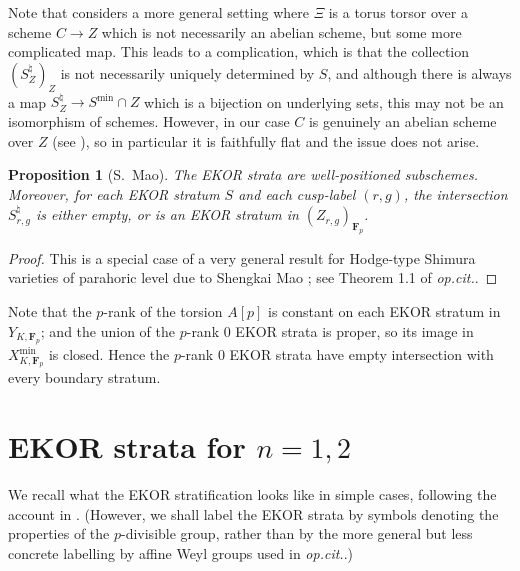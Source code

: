 \documentclass[cjm]{ipart}
\theoremstyle{plain}
\newtheorem{proposition}[theorem]{Proposition}
\theoremstyle{remark}
\newcommand{\Fp}{\mathbf{F}_p}
\numberwithin{equation}{subsection}
\begin{document}
  \begin{remark}
   Note that \cite{lanstroh} considers a more general setting where $\Xi$ is a torus torsor over a scheme $C \to Z$ which is not necessarily an abelian scheme, but some more complicated map. This leads to a complication, which is that the collection $(S_Z^\natural)_Z$ is not necessarily uniquely determined by $S$, and although there is always a map $S_Z^\natural \to S^{\min} \cap Z$ which is a bijection on underlying sets, this may not be an isomorphism of schemes. However, in our case $C$ is genuinely an abelian scheme over $Z$ (see \cite{pilloni20}), so in particular it is faithfully flat and the issue does not arise.
  \end{remark}

  \begin{proposition}[S.~Mao]
   \label{prop:lanstroh}
   The EKOR strata are well-positioned subschemes. Moreover, for each EKOR stratum $S$ and each cusp-label $(r, g)$, the intersection $S^{\natural}_{r, g}$ is either empty, or is an EKOR stratum in $(Z_{r, g})_{\Fp}$.
  \end{proposition}
  
  \begin{proof}
   This is a special case of a very general result for Hodge-type Shimura varieties of parahoric level due to Shengkai Mao \cite{mao-preprint}; see Theorem 1.1 of \emph{op.cit.}.
  \end{proof}
  
  \begin{remark}
   Note that the $p$-rank of the torsion $A[p]$ is constant on each EKOR stratum in $Y_{K, \Fp}$; and the union of the $p$-rank 0 EKOR strata is proper, so its image in $X_{K, \Fp}^{\min}$ is closed. Hence the $p$-rank 0 EKOR strata have empty intersection with every boundary stratum.
  \end{remark}

\section{EKOR strata for \texorpdfstring{$n = 1, 2$}{n = 1 and 2}}
 \label{sect:EKORexplicit}

 We recall what the EKOR stratification looks like in simple cases, following the account in \cite{shenyuzhang21}. (However, we shall label the EKOR strata by symbols denoting the properties of the $p$-divisible group, rather than by the more general but less concrete labelling by affine Weyl groups used in \emph{op.cit.}.)
\end{document}
